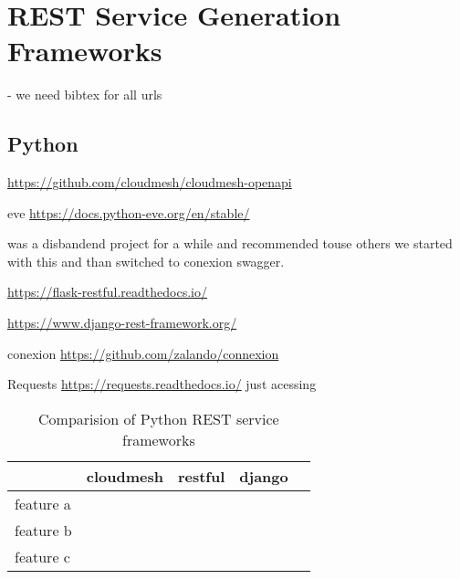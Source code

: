 \section{REST Service Generation Frameworks}

- we need bibtex for all urls

\subsection{Python}

\begin{description}

\item[cloudmesh]

\url{https://github.com/cloudmesh/cloudmesh-openapi} 

\item {eve} \url{https://docs.python-eve.org/en/stable/}

was a disbandend project for a while and recommended touse others we started with this and than switched to conexion swagger.

\item[restful]

\url{https://flask-restful.readthedocs.io/}

\item[django] \url{https://www.django-rest-framework.org/}

\item{conexion} \url{https://github.com/zalando/connexion}

\item{Requests} \url{https://requests.readthedocs.io/}  just acessing

\end{description}

\begin{table}[htb]

\caption{Comparision of Python REST service frameworks}

\begin{tabular}{|l|l|l|l|l|}
\hline

 & cloudmesh &  restful &  django &  \\ \hline
 feature a &  &  &  &  \\ \hline
 feature b &  &  &  &  \\ \hline
 feature c &  &  &  &  \\ \hline
\end{tabular}

\end{table}
